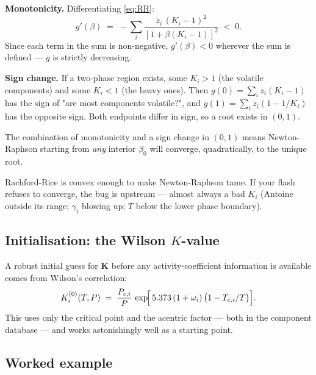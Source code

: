 \documentclass[11pt,a4paper]{article}
\newcommand{\Kv}{\mathbf{K}}
\begin{document}
\textbf{Monotonicity.} Differentiating \eqref{eq:RR}:
\[
   g'(\beta) \;=\; -\sum_i \frac{z_i \, (K_i - 1)^2}{[1 + \beta(K_i - 1)]^2}
                 \;<\; 0.
\]
Since each term in the sum is non-negative, $g'(\beta) < 0$ wherever the
sum is defined --- $g$ is strictly decreasing.

\textbf{Sign change.} If a two-phase region exists, some $K_i > 1$ (the
volatile components) and some $K_i < 1$ (the heavy ones). Then
$g(0) = \sum_i z_i (K_i - 1)$ has the sign of "are most components
volatile?", and $g(1) = \sum_i z_i (1 - 1/K_i)$ has the opposite sign.
Both endpoints differ in sign, so a root exists in $(0, 1)$.

The combination of monotonicity and a sign change in $(0,1)$ means
Newton-Raphson starting from \emph{any} interior $\beta_0$ will converge,
quadratically, to the unique root.

\begin{keyidea}
Rachford-Rice is convex enough to make Newton-Raphson tame. If your
flash refuses to converge, the bug is upstream --- almost always a bad
$K_i$ (Antoine outside its range; $\gamma_i$ blowing up; $T$ below
the lower phase boundary).
\end{keyidea}

\subsection{Initialisation: the Wilson $K$-value}

A robust initial guess for $\Kv$ before any activity-coefficient
information is available comes from Wilson's correlation:
\begin{equation}
   K_i^{(0)}(T, P) \;=\; \frac{P_{c,i}}{P}\,
                         \exp\!\Bigl[\,5.373\,(1 + \omega_i)\,
                         \bigl(1 - T_{c,i}/T\bigr)\Bigr].
   \label{eq:wilson-K}
\end{equation}
This uses only the critical point and the acentric factor --- both in
the component database --- and works astonishingly well as a starting
point.

\subsection{Worked example}
\end{document}
